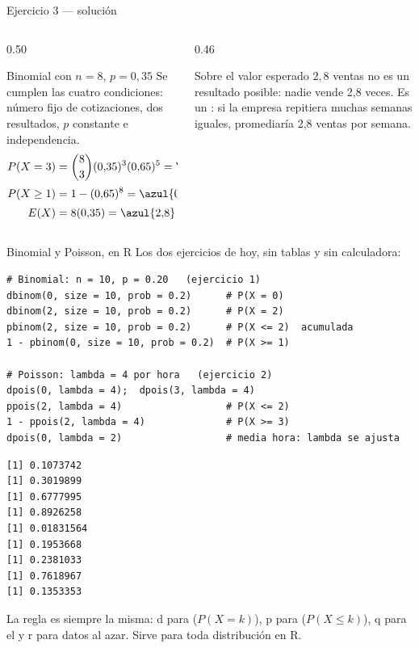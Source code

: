 \documentclass[aspectratio=169,10pt]{beamer}
\newcommand{\fx}[1]{{\ttfamily\color{uniAzul}#1}}
\begin{document}
\begin{frame}{Ejercicio 3 — solución}
  \begin{columns}[T,onlytextwidth]
    \begin{column}{0.50\textwidth}
      \begin{block}{Binomial con $n=8$, $p=0{,}35$}
        \footnotesize
        Se cumplen las cuatro condiciones: número fijo de cotizaciones, dos
        resultados, $p$ constante e independencia.
        \begin{align*}
          P(X=3)&=\binom{8}{3}(0{,}35)^{3}(0{,}65)^{5}=\azul{0{,}2786}\\[0.2em]
          P(X\ge 1)&=1-(0{,}65)^{8}=\azul{0{,}9681}\\[0.2em]
          E(X)&=8(0{,}35)=\azul{2{,}8}\text{ ventas}
        \end{align*}
      \end{block}
    \end{column}
    \begin{column}{0.46\textwidth}
      \begin{alertblock}{Sobre el valor esperado}
        \footnotesize
        $2{,}8$ ventas no es un resultado posible: nadie vende 2,8 veces. Es un
        : si la empresa repitiera muchas semanas
        iguales, promediaría 2,8 ventas por semana.
      \end{alertblock}
    \end{column}
  \end{columns}
\end{frame}

\begin{frame}[fragile]{Binomial y Poisson, en R}
  \scriptsize
  Los dos ejercicios de hoy, sin tablas y sin calculadora:
\begin{lstlisting}[style=Rmini]
# Binomial: n = 10, p = 0.20   (ejercicio 1)
dbinom(0, size = 10, prob = 0.2)      # P(X = 0)
dbinom(2, size = 10, prob = 0.2)      # P(X = 2)
pbinom(2, size = 10, prob = 0.2)      # P(X <= 2)  acumulada
1 - pbinom(0, size = 10, prob = 0.2)  # P(X >= 1)

# Poisson: lambda = 4 por hora   (ejercicio 2)
dpois(0, lambda = 4);  dpois(3, lambda = 4)
ppois(2, lambda = 4)                  # P(X <= 2)
1 - ppois(2, lambda = 4)              # P(X >= 3)
dpois(0, lambda = 2)                  # media hora: lambda se ajusta
\end{lstlisting}
\begin{lstlisting}[style=Rout]
[1] 0.1073742
[1] 0.3019899
[1] 0.6777995
[1] 0.8926258
[1] 0.01831564
[1] 0.1953668
[1] 0.2381033
[1] 0.7618967
[1] 0.1353353
\end{lstlisting}

  \vspace{-0.12cm}
  {\tiny\color{uniGris} La regla es siempre la misma: \fx{d} para
   ($P(X=k)$), \fx{p} para  ($P(X\le k)$), \fx{q} para el  y \fx{r} para
   datos al azar. Sirve para toda distribución en R.}
\end{frame}
\end{document}
